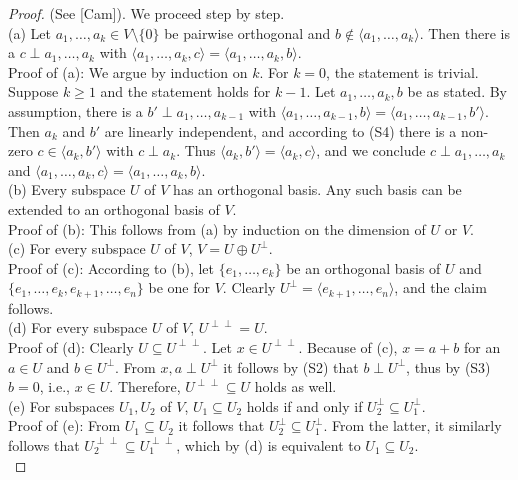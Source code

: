 \documentclass[11pt,a4paper]{article}
\begin{document}
\begin{proof}
(See [Cam]). We proceed step by step. \\
(a) Let $a_1, \dots, a_k \in V \setminus \{0\}$ be pairwise orthogonal and $b \notin \langle a_1, \dots, a_k \rangle$. Then there is a $c \perp a_1, \dots, a_k$ with $\langle a_1, \dots, a_k, c \rangle = \langle a_1, \dots, a_k, b \rangle$. \\
Proof of (a): We argue by induction on $k$. For $k = 0$, the statement is trivial. Suppose $k \ge 1$ and the statement holds for $k-1$. Let $a_1, \dots, a_k, b$ be as stated. By assumption, there is a $b' \perp a_1, \dots, a_{k-1}$ with $\langle a_1, \dots, a_{k-1}, b \rangle = \langle a_1, \dots, a_{k-1}, b' \rangle$. Then $a_k$ and $b'$ are linearly independent, and according to (S4) there is a non-zero $c \in \langle a_k, b' \rangle$ with $c \perp a_k$. Thus $\langle a_k, b' \rangle = \langle a_k, c \rangle$, and we conclude $c \perp a_1, \dots, a_k$ and $\langle a_1, \dots, a_k, c \rangle = \langle a_1, \dots, a_k, b \rangle$. \\
(b) Every subspace $U$ of $V$ has an orthogonal basis. Any such basis can be extended to an orthogonal basis of $V$. \\
Proof of (b): This follows from (a) by induction on the dimension of $U$ or $V$. \\
(c) For every subspace $U$ of $V$, $V = U \oplus U^\perp$. \\
Proof of (c): According to (b), let $\{e_1, \dots, e_k\}$ be an orthogonal basis of $U$ and $\{e_1, \dots, e_k, e_{k+1}, \dots, e_n\}$ be one for $V$. Clearly $U^\perp = \langle e_{k+1}, \dots, e_n \rangle$, and the claim follows. \\
(d) For every subspace $U$ of $V$, $U^{\perp\perp} = U$. \\
Proof of (d): Clearly $U \subseteq U^{\perp\perp}$. Let $x \in U^{\perp\perp}$. Because of (c), $x = a + b$ for an $a \in U$ and $b \in U^\perp$. From $x, a \perp U^\perp$ it follows by (S2) that $b \perp U^\perp$, thus by (S3) $b = 0$, i.e., $x \in U$. Therefore, $U^{\perp\perp} \subseteq U$ holds as well. \\
(e) For subspaces $U_1, U_2$ of $V$, $U_1 \subseteq U_2$ holds if and only if $U_2^\perp \subseteq U_1^\perp$. \\
Proof of (e): From $U_1 \subseteq U_2$ it follows that $U_2^\perp \subseteq U_1^\perp$. From the latter, it similarly follows that $U_2^{\perp\perp} \subseteq U_1^{\perp\perp}$, which by (d) is equivalent to $U_1 \subseteq U_2$. \\

\end{proof}
\end{document}
